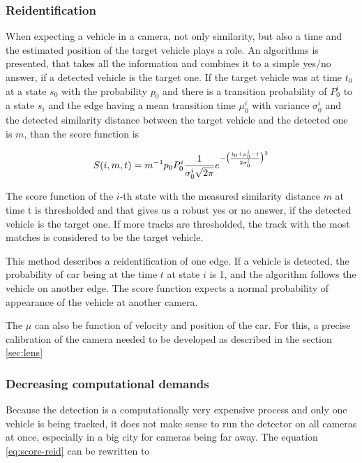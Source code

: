 \documentclass[a4paper,12pt,titlepage, twoside]{article}
\numberwithin{figure}{section}
\begin{document}
\subsubsection{Reidentification}
\label{sec:reidentification}
When expecting a vehicle in a camera, not only similarity, but also a time and the estimated position of the target vehicle plays a role. An algorithms is presented, that takes all the information and combines it to a simple yes/no answer, if a detected vehicle is the target one. If the target vehicle was at time $t_0$ at a state $s_0$ with the probability $p_0$ and there is a transition probability of $P_0^i$ to a state $s_i$ and the edge having a mean transition time $\mu_0^i$ with variance $\sigma_0^i$ and the detected similarity distance between the target vehicle and the detected one is $m$, than the score function is 

\begin{equation}
\label{eq:score-reid}
S(i, m, t) = m^{-1}p_0 P_0^i \frac{1}{\sigma_0^i \sqrt{2\pi}}e^{-\big{(}\frac{t_0 + \mu_0^i - t}{2\sigma_0^i}\big{)}^2}
\end{equation}

The score function of the $i$-th state with the measured similarity distance $m$ at time t is  thresholded and that gives us a robust yes or no answer, if the detected vehicle is the target one. If more tracks are thresholded, the track with the most matches is considered to be the target vehicle.

This method describes a reidentification of one edge. If a vehicle is detected, the probability of car being at the time $t$ at state $i$ is 1, and the algorithm follows the vehicle on another edge. The score function expects a normal probability of appearance of the vehicle at another camera. 

The $\mu$ can also be function of velocity and position of the car. For this, a precise calibration of the camera needed to be developed as described in the section \ref{sec:lens}

\subsubsection{Decreasing computational demands}
Because the detection is a computationally very expensive process and only one vehicle is being tracked, it does not make sense to run the detector on all cameras at once, especially in a big city for cameras being far away. The equation \ref{eq:score-reid} can be rewritten to
\end{document}

